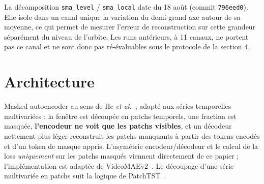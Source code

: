 \documentclass{article}
\begin{document}
\vspace{0.3cm}
\noindent{}
\vspace{0.3cm}

La décomposition \texttt{sma\_level} / \texttt{sma\_local} date du 18 août (commit \texttt{796eed0}). Elle isole dans un canal unique la variation du demi-grand axe autour de sa moyenne, ce qui permet de mesurer l'erreur de reconstruction sur cette grandeur séparément du niveau de l'orbite. Les runs antérieurs, à 11 canaux, ne portent pas ce canal et ne sont donc pas ré-évaluables sous le protocole de la section 4.

\section{Architecture}

Masked autoencoder au sens de He \textit{et al.}~\cite{he2022mae}, adapté aux séries temporelles multivariées : la fenêtre est découpée en patchs temporels, une fraction est masquée, \textbf{l'encodeur ne voit que les patchs visibles}, et un décodeur nettement plus léger reconstruit les patchs manquants à partir des tokens encodés et d'un token de masque appris. L'asymétrie encodeur/décodeur et le calcul de la loss \emph{uniquement} sur les patchs masqués viennent directement de ce papier ; l'implémentation est adaptée de VideoMAEv2~\cite{wang2023videomaev2}. Le découpage d'une série multivariée en patchs suit la logique de PatchTST~\cite{nie2023patchtst}.
\end{document}
